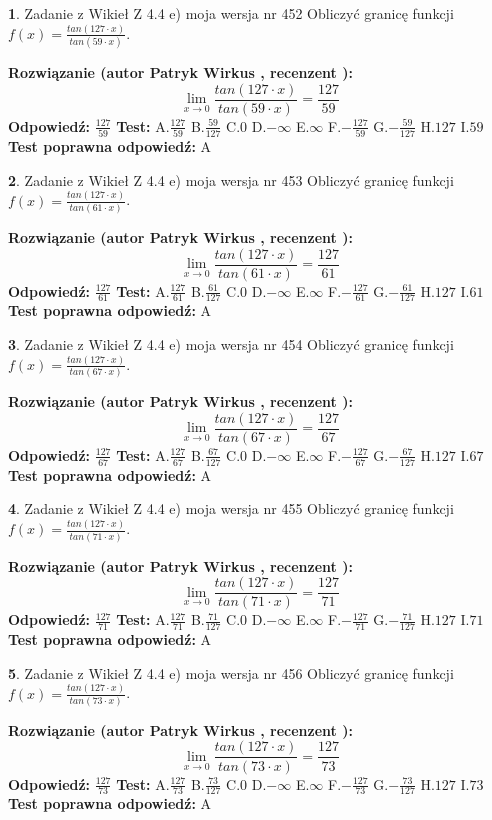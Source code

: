 \documentclass[12pt, a4paper]{article}
\theoremstyle{definition} %
\newtheorem{zad}{}
\newcommand{\zadStart}[1]{\begin{zad}#1\newline}
\newcommand{\zadStop}{\end{zad}}
\newcommand{\rozwStart}[2]{\noindent \textbf{Rozwiązanie (autor #1 , recenzent #2): }\newline}
\newcommand{\rozwStop}{\newline}
\newcommand{\odpStart}{\noindent \textbf{Odpowiedź:}\newline}
\newcommand{\odpStop}{\newline}
\newcommand{\testStart}{\noindent \textbf{Test:}\newline}
\newcommand{\testStop}{\newline}
\newcommand{\kluczStart}{\noindent \textbf{Test poprawna odpowiedź:}\newline}
\newcommand{\kluczStop}{\newline}
\begin{document}
\zadStart{Zadanie z Wikieł Z 4.4 e) moja wersja nr 452}
Obliczyć granicę funkcji $f(x)=\frac{tan(127\cdot x)}{tan(59\cdot x)}$.
\zadStop
\rozwStart{Patryk Wirkus}{}
$$\lim\limits_{x\to 0}\frac{tan(127\cdot x)}{tan(59\cdot x)}=
\frac{127}{59}$$
\rozwStop
\odpStart
$\frac{127}{59}$
\odpStop
\testStart
A.$\frac{127}{59}$
B.$\frac{59}{127}$
C.$0$
D.$-\infty$
E.$\infty$
F.$-\frac{127}{59}$
G.$-\frac{59}{127}$
H.$127$
I.$59$
\testStop
\kluczStart
A
\kluczStop



\zadStart{Zadanie z Wikieł Z 4.4 e) moja wersja nr 453}
Obliczyć granicę funkcji $f(x)=\frac{tan(127\cdot x)}{tan(61\cdot x)}$.
\zadStop
\rozwStart{Patryk Wirkus}{}
$$\lim\limits_{x\to 0}\frac{tan(127\cdot x)}{tan(61\cdot x)}=
\frac{127}{61}$$
\rozwStop
\odpStart
$\frac{127}{61}$
\odpStop
\testStart
A.$\frac{127}{61}$
B.$\frac{61}{127}$
C.$0$
D.$-\infty$
E.$\infty$
F.$-\frac{127}{61}$
G.$-\frac{61}{127}$
H.$127$
I.$61$
\testStop
\kluczStart
A
\kluczStop



\zadStart{Zadanie z Wikieł Z 4.4 e) moja wersja nr 454}
Obliczyć granicę funkcji $f(x)=\frac{tan(127\cdot x)}{tan(67\cdot x)}$.
\zadStop
\rozwStart{Patryk Wirkus}{}
$$\lim\limits_{x\to 0}\frac{tan(127\cdot x)}{tan(67\cdot x)}=
\frac{127}{67}$$
\rozwStop
\odpStart
$\frac{127}{67}$
\odpStop
\testStart
A.$\frac{127}{67}$
B.$\frac{67}{127}$
C.$0$
D.$-\infty$
E.$\infty$
F.$-\frac{127}{67}$
G.$-\frac{67}{127}$
H.$127$
I.$67$
\testStop
\kluczStart
A
\kluczStop



\zadStart{Zadanie z Wikieł Z 4.4 e) moja wersja nr 455}
Obliczyć granicę funkcji $f(x)=\frac{tan(127\cdot x)}{tan(71\cdot x)}$.
\zadStop
\rozwStart{Patryk Wirkus}{}
$$\lim\limits_{x\to 0}\frac{tan(127\cdot x)}{tan(71\cdot x)}=
\frac{127}{71}$$
\rozwStop
\odpStart
$\frac{127}{71}$
\odpStop
\testStart
A.$\frac{127}{71}$
B.$\frac{71}{127}$
C.$0$
D.$-\infty$
E.$\infty$
F.$-\frac{127}{71}$
G.$-\frac{71}{127}$
H.$127$
I.$71$
\testStop
\kluczStart
A
\kluczStop



\zadStart{Zadanie z Wikieł Z 4.4 e) moja wersja nr 456}
Obliczyć granicę funkcji $f(x)=\frac{tan(127\cdot x)}{tan(73\cdot x)}$.
\zadStop
\rozwStart{Patryk Wirkus}{}
$$\lim\limits_{x\to 0}\frac{tan(127\cdot x)}{tan(73\cdot x)}=
\frac{127}{73}$$
\rozwStop
\odpStart
$\frac{127}{73}$
\odpStop
\testStart
A.$\frac{127}{73}$
B.$\frac{73}{127}$
C.$0$
D.$-\infty$
E.$\infty$
F.$-\frac{127}{73}$
G.$-\frac{73}{127}$
H.$127$
I.$73$
\testStop
\kluczStart
A
\kluczStop
\end{document}
